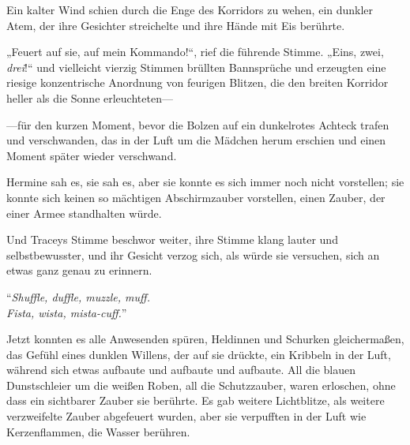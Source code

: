 Ein kalter Wind schien durch die Enge des Korridors zu wehen, ein dunkler Atem, der ihre Gesichter streichelte und ihre Hände mit Eis berührte.

„Feuert auf sie, auf mein Kommando!“, rief die führende Stimme. „Eins, zwei, \emph{drei}!“ und vielleicht vierzig Stimmen brüllten Bannsprüche und erzeugten eine riesige konzentrische Anordnung von feurigen Blitzen, die den breiten Korridor heller als die Sonne erleuchteten—

—für den kurzen Moment, bevor die Bolzen auf ein dunkelrotes Achteck trafen und verschwanden, das in der Luft um die Mädchen herum erschien und einen Moment später wieder verschwand.

Hermine sah es, sie sah es, aber sie konnte es sich immer noch nicht vorstellen; sie konnte sich keinen so mächtigen Abschirmzauber vorstellen, einen Zauber, der einer Armee standhalten würde.

Und Traceys Stimme beschwor weiter, ihre Stimme klang lauter und selbstbewusster, und ihr Gesicht verzog sich, als würde sie versuchen, sich an etwas ganz genau zu erinnern.

“\emph{Shuffle, duffle, muzzle, muff.\\
Fista, wista, mista-cuff.}”

Jetzt konnten es alle Anwesenden spüren, Heldinnen und Schurken gleichermaßen, das Gefühl eines dunklen Willens, der auf sie drückte, ein Kribbeln in der Luft, während sich etwas aufbaute und aufbaute und aufbaute. All die blauen Dunstschleier um die weißen Roben, all die Schutzzauber, waren erloschen, ohne dass ein sichtbarer Zauber sie berührte. Es gab weitere Lichtblitze, als weitere verzweifelte Zauber abgefeuert wurden, aber sie verpufften in der Luft wie Kerzenflammen, die Wasser berühren.

